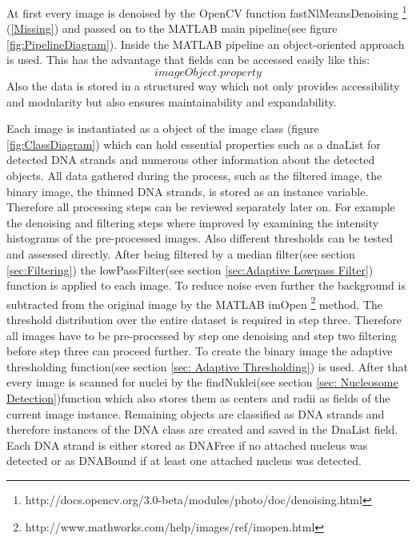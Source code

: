 \documentclass{article}
\begin{document}
At first every image is denoised by the OpenCV function fastNlMeansDenoising \footnote{http://docs.opencv.org/3.0-beta/modules/photo/doc/denoising.html} 
(\ref{Missing}) and passed on to the MATLAB main pipeline(see figure \ref{fig:PipelineDiagram}). %
Inside the MATLAB pipeline an object-oriented approach is used.
This has the advantage that fields can be accessed easily like this:
\[
 imageObject.property
\]
Also the data is stored in a structured way which not only provides accessibility and modularity but also ensures maintainability and expandability.

Each image is instantiated as a object of the image class (figure \ref{fig:ClassDiagram}) which can hold essential properties such as a dnaList for detected DNA strands and numerous other information about the detected objects.
All data gathered during the process, such as the filtered image, the binary image, the thinned DNA strands, is stored as an instance variable.
Therefore all processing steps can be reviewed separately later on.
For example the denoising and filtering steps where improved by examining the intensity histograms of the pre-processed images.
Also different thresholds can be tested and assessed directly.
After being filtered by a median filter(see section \ref{sec:Filtering}) the lowPassFilter(see section \ref{sec:Adaptive Lowpass Filter}) function is applied to each image. 
To reduce noise even further the background is subtracted from the original image by the MATLAB imOpen \footnote{http://www.mathworks.com/help/images/ref/imopen.html} method.
The threshold distribution over the entire dataset is required in step three. Therefore all images have to be pre-processed by step one denoising and step two filtering before step three can proceed further. 
To create the binary image the adaptive thresholding function(see section \ref{sec: Adaptive Thresholding}) is used.
After that every image is scanned for nuclei by the findNuklei(see section \ref{sec: Nucleosome Detection})function which also stores them as centers and radii as fields of the current image instance.
Remaining objects are classified as DNA strands and therefore instances of the DNA class are created and saved in the DnaList field.
Each DNA strand is either stored as DNAFree if no attached nucleus was detected or as DNABound if at least one attached nucleus was detected.
\end{document}
